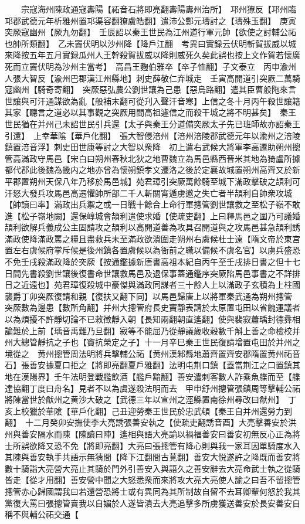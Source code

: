 　　宗寇海州陳政通寇夀陽【祏音石將即亮翻夀陽夀州治所】　邛州獠反【邛州臨邛郡武德元年析雅州置邛渠容翻獠盧皓翻】遣沛公鄭元璹討之【璹殊玉翻】　庚寅突厥寇幽州【厥九勿翻】　壬辰詔以秦王世民為江州道行軍元帥【欲使之討輔公祏也帥所類翻】　乙未竇伏明以沙州降【降戶江翻　考異曰實録云伏明斬賀拔威以城來降按五年五月實録瓜州人王幹殺賀拔威以降則威死久矣此誤也按上文作賀若懷廣死而立竇伏明為沙州主當考】　高昌王麴伯雅卒【卒子恤翻】子文泰立　丙申渝州人張大智反【渝州巴郡漢江州縣地】刺史薛敬仁弃城走　壬寅高開道引突厥二萬騎寇幽州【騎奇寄翻】　突厥惡弘農公劉世讓為己患【惡烏路翻】遣其臣曹般陁來言世讓與可汗通謀欲為亂【般補末翻可從刋入聲汗音寒】上信之冬十月丙午殺世讓籍其家【聽言之道必以其事觀之突厥用間高祖遽信之而殺干城之將不明甚矣】　秦王世民猶在并州己未詔世民引兵還【太子與秦王分道備突厥太子先已班師故亦詔秦王引還】　上幸華隂【華戶化翻】　張大智侵涪州【涪州涪陵郡武德元年以渝州之涪陵鎮置涪音浮】刺史田世康等討之大智以衆降　初上遣右武候大將軍李高遷助朔州摠管高滿政守馬邑【宋白曰朔州春秋北狄之地曹魏立為馬邑縣西晉米其地為猗盧所據都代郡此後魏為畿内之地亦曾為懷朔鎮孝文遷洛之後於定襄故城置朔州高齊又於新平郡置朔州天保八年乃移於馬邑城】苑君璋引突厥萬餘騎至城下滿政擊破之頡利可汗怒大發兵攻馬邑高遷懼帥所部二千人斬關宵遁虜邀之失亡者半頡利自帥衆攻城【帥讀曰率】滿政出兵禦之或一日戰十餘合上命行軍摠管劉世讓救之至松子嶺不敢進【松子嶺地闕】還保崞城會頡利遣使求婚【使疏吏翻】上曰釋馬邑之圍乃可議婚頡利欲解兵義成公主固請攻之頡利以高開道善為攻具召開道與之攻馬邑甚急頡利誘滿政使降滿政罵之糧且盡救兵未至滿政欲潰圍走朔州右虞候杜士遠【隋文帝於東宫置左右虞候府掌斥候是後州鎮各置虞候以為衙前之職以備候不虞名官】以虜兵盛恐不免壬戌殺滿政降於突厥【按通鑑據新唐書高祖本紀自丙午至壬戌排日書之但十七日間先書殺劉世讓後復書命世讓救馬邑及退保事蓋通鑑序突厥陷馬邑事書之不詳排日之近遠也】苑君璋復殺城中豪傑與滿政同謀者三十餘人上以滿政子玄積為上柱國襲爵丁卯突厥復請和親【復扶又翻下同】以馬邑歸唐上以將軍秦武通為朔州摠管　突厥數為邊患【數所角翻】并州大摠管府長史竇靜表請於太原置屯田以省餽運議者以為煩擾不許靜切論不已敕徵靜入朝【長知兩翻朝直遙翻】使與裴寂蕭瑀封德彞相論難於上前【瑀音禹難乃旦翻】寂等不能屈乃從靜議歲收穀數千斛上善之命檢校并州大總管靜抗之子也【竇抗榮定之子】十一月辛巳秦王世民復請增置屯田於并州之境從之　黄州摠管周法明將兵擊輔公祏【黄州漢邾縣地蕭齊置齊安郡隋置黄州祏音石】張善安據夏口拒之【將即亮翻夏戶雅翻】法明屯荆口鎮【蓋當荆江之口置鎮其地在漢陽界】壬午法明登戰艦飲酒【艦戶黯翻】善安遣刺客數人詐乘魚艓而至【艓達協翻丁度曰舟名】見者不以為虞遂殺法明而去　甲申舒州摠管張鎮周等擊輔公祏將陳當世於猷州之黄沙大破之【武德三年以宣州之涇縣置南徐州尋改曰猷州】　丁亥上校獵於華隂【華戶化翻】己丑迎勞秦王世民於忠武頓【秦王自并州還勞力到翻】　十二月癸卯安撫使李大亮誘張善安執之【使疏吏翻誘音酉】大亮擊善安於洪州與善安隔水而陳【陳讀曰陣】遙相與語大亮諭以禍福善安曰善安初無反心正為將士所誤欲降又恐不免【將即亮翻】大亮曰張摠管有降心則與我一家耳因單騎度水入其陳與善安執手共語示無猜間【降下江翻間古莧翻】善安大悦遂許之降既而善安將數十騎詣大亮營大亮止其騎於門外引善安入與語久之善安辭去大亮命武士執之從騎皆走【從才用翻】善安營中聞之大怒悉衆而來將攻大亮大亮使人諭之曰吾不留摠管摠管赤心歸國謂我曰若還營恐將士或有異同為其所制故自留不去耳卿輩何怒於我其黨復大罵曰張摠管賣我以自媚於人遂皆潰去大亮追擊多所虜獲送善安於長安善安自稱不與輔公祏交通【